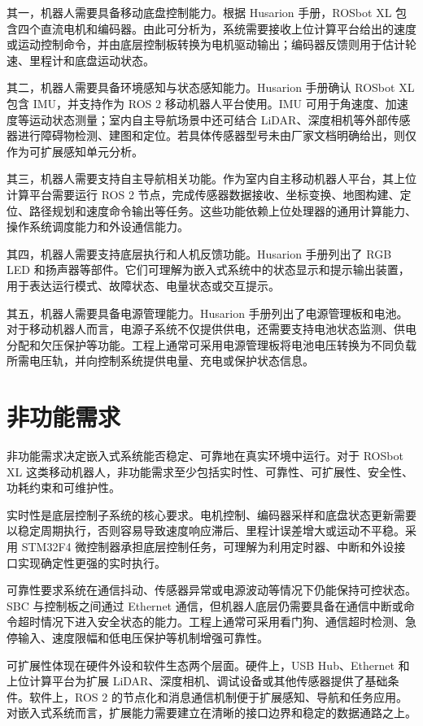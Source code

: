 \documentclass[UTF8,a4paper,12pt]{ctexrep}
\begin{document}
其一，机器人需要具备移动底盘控制能力。根据 Husarion 手册，ROSbot XL 包含四个直流电机和编码器。由此可分析为，系统需要接收上位计算平台给出的速度或运动控制命令，并由底层控制板转换为电机驱动输出；编码器反馈则用于估计轮速、里程计和底盘运动状态。

其二，机器人需要具备环境感知与状态感知能力。Husarion 手册确认 ROSbot XL 包含 IMU，并支持作为 ROS 2 移动机器人平台使用。IMU 可用于角速度、加速度等运动状态测量；室内自主导航场景中还可结合 LiDAR、深度相机等外部传感器进行障碍物检测、建图和定位。若具体传感器型号未由厂家文档明确给出，则仅作为可扩展感知单元分析。

其三，机器人需要支持自主导航相关功能。作为室内自主移动机器人平台，其上位计算平台需要运行 ROS 2 节点，完成传感器数据接收、坐标变换、地图构建、定位、路径规划和速度命令输出等任务。这些功能依赖上位处理器的通用计算能力、操作系统调度能力和外设通信能力。

其四，机器人需要支持底层执行和人机反馈功能。Husarion 手册列出了 RGB LED 和扬声器等部件。它们可理解为嵌入式系统中的状态显示和提示输出装置，用于表达运行模式、故障状态、电量状态或交互提示。

其五，机器人需要具备电源管理能力。Husarion 手册列出了电源管理板和电池。对于移动机器人而言，电源子系统不仅提供供电，还需要支持电池状态监测、供电分配和欠压保护等功能。工程上通常可采用电源管理板将电池电压转换为不同负载所需电压轨，并向控制系统提供电量、充电或保护状态信息。

\section{非功能需求}

非功能需求决定嵌入式系统能否稳定、可靠地在真实环境中运行。对于 ROSbot XL 这类移动机器人，非功能需求至少包括实时性、可靠性、可扩展性、安全性、功耗约束和可维护性。

实时性是底层控制子系统的核心要求。电机控制、编码器采样和底盘状态更新需要以稳定周期执行，否则容易导致速度响应滞后、里程计误差增大或运动不平稳。采用 STM32F4 微控制器承担底层控制任务，可理解为利用定时器、中断和外设接口实现确定性更强的实时执行。

可靠性要求系统在通信抖动、传感器异常或电源波动等情况下仍能保持可控状态。SBC 与控制板之间通过 Ethernet 通信，但机器人底层仍需要具备在通信中断或命令超时情况下进入安全状态的能力。工程上通常可采用看门狗、通信超时检测、急停输入、速度限幅和低电压保护等机制增强可靠性。

可扩展性体现在硬件外设和软件生态两个层面。硬件上，USB Hub、Ethernet 和上位计算平台为扩展 LiDAR、深度相机、调试设备或其他传感器提供了基础条件。软件上，ROS 2 的节点化和消息通信机制便于扩展感知、导航和任务应用。对嵌入式系统而言，扩展能力需要建立在清晰的接口边界和稳定的数据通路之上。
\end{document}
